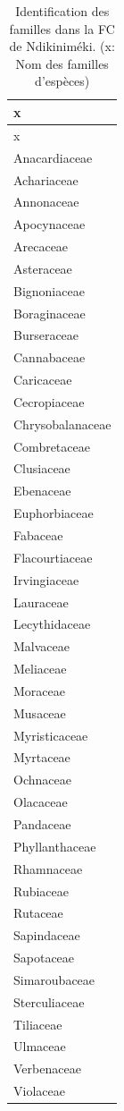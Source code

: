 \documentclass[
  12pt,
  a4paper,
  extrafontsizes,
  onecolumn,
  openright]{book}
\theoremstyle{definition}
\theoremstyle{definition}
\theoremstyle{definition}
\theoremstyle{definition}
\theoremstyle{remark}
\begin{document}
\begin{longtable}[]{@{}l@{}}
\caption{\label{tab:Familles-Ndikinimeki3}Identification des familles dans la FC de Ndikiniméki. (x: Nom des familles d'espèces)}\tabularnewline
\toprule()
x \\
\midrule()
\endfirsthead
\toprule()
x \\
\midrule()
\endhead
Anacardiaceae \\
Achariaceae \\
Annonaceae \\
Apocynaceae \\
Arecaceae \\
Asteraceae \\
Bignoniaceae \\
Boraginaceae \\
Burseraceae \\
Cannabaceae \\
Caricaceae \\
Cecropiaceae \\
Chrysobalanaceae \\
Combretaceae \\
Clusiaceae \\
Ebenaceae \\
Euphorbiaceae \\
Fabaceae \\
Flacourtiaceae \\
Irvingiaceae \\
Lauraceae \\
Lecythidaceae \\
Malvaceae \\
Meliaceae \\
Moraceae \\
Musaceae \\
Myristicaceae \\
Myrtaceae \\
Ochnaceae \\
Olacaceae \\
Pandaceae \\
Phyllanthaceae \\
Rhamnaceae \\
Rubiaceae \\
Rutaceae \\
Sapindaceae \\
Sapotaceae \\
Simaroubaceae \\
Sterculiaceae \\
Tiliaceae \\
Ulmaceae \\
Verbenaceae \\
Violaceae \\
\bottomrule()
\end{longtable}
\end{document}
